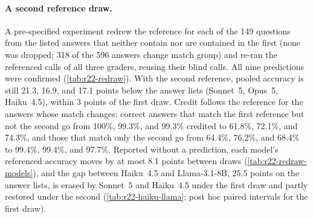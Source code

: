 \begin{table}[htbp]
\centering
\caption{The benchmark study under three graders: pooled changes against the answer lists (points, 95\% CI) at score thresholds 5, 7, and 10, the max rule at 7, and the shares of correct non-matching answers scored 3 or below, blind and with the reference. For Opus~5 and Haiku~4.5, threshold 7 and the max rule carry registered predictions and thresholds 5 and 10 are registered readouts; Sonnet~5's thresholds 5 and 10 and its max rule are post hoc.}
\label{tab:r21-graders}
\footnotesize

\end{table}

\paragraph{A second reference draw.}
A pre-specified experiment redrew the reference for each of the 149 questions from the listed answers that neither contain nor are contained in the first (none was dropped; 318 of the 596 answers change match group) and re-ran the referenced calls of all three graders, reusing their blind calls. All nine predictions were confirmed (\cref{tab:r22-redraw}). With the second reference, pooled accuracy is still 21.3, 16.9, and 17.1 points below the answer lists (Sonnet~5, Opus~5, Haiku~4.5), within 3 points of the first draw. Credit follows the reference for the answers whose match changes: correct answers that match the first reference but not the second go from 100\%, 99.3\%, and 99.3\% credited to 61.8\%, 72.1\%, and 74.3\%, and those that match only the second go from 64.4\%, 76.2\%, and 68.4\% to 99.4\%, 99.4\%, and 97.7\%. Reported without a prediction, each model's referenced accuracy moves by at most 8.1 points between draws (\cref{tab:r22-redraw-models}), and the gap between Haiku~4.5 and Llama-3.1-8B, 25.5 points on the answer lists, is erased by Sonnet~5 and Haiku~4.5 under the first draw and partly restored under the second (\cref{tab:r22-haiku-llama}; post hoc paired intervals for the first draw).

\begin{table}[htbp]
\centering
\caption{The benchmark study under a second reference draw: pooled referenced minus answer-list accuracy under each draw and its change (points, 95\% CI, question bootstrap), and the share of correct answers credited (score 7 or above) among those that stop or start matching the reference between draws. Opus~5 uses the 136 questions with both draws complete.\pre}
\label{tab:r22-redraw}
\footnotesize
\setlength{\tabcolsep}{3pt}

\end{table}

